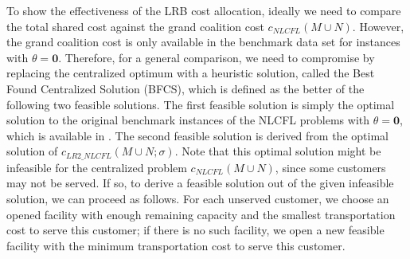 \documentclass[ijoc,nonblindrev]{informs3} %
\begin{document}
To show the effectiveness of the LRB cost allocation, ideally we need to compare the total shared cost against the grand coalition cost $c_{NLCFL}(M \cup N)$.
However, the grand coalition cost is only available in the benchmark data set for instances with $\theta=\textbf{0}$.
Therefore, for a general comparison, we need to compromise by replacing the centralized optimum with a heuristic solution, called the Best Found Centralized Solution (BFCS), which is defined as the better of the following two feasible solutions.
The first feasible solution is simply the optimal solution to the original benchmark instances of the NLCFL problems with $\theta = \textbf{0}$, which is available in \cite{Bachrach2009Cost}.
The second feasible solution is derived from the optimal solution of $c_{LR2\_NLCFL}(M \cup N;\sigma)$.
Note that this optimal solution might be infeasible for the centralized problem $c_{NLCFL}(M \cup N)$, since some customers may not be served.
If so, to derive a feasible solution out of the given infeasible solution, we can proceed as follows.
For each unserved customer, we choose an opened facility with enough remaining capacity and the smallest transportation cost to serve this customer; if there is no such facility, we open a new feasible facility with the minimum transportation cost to serve this customer.
\end{document}
